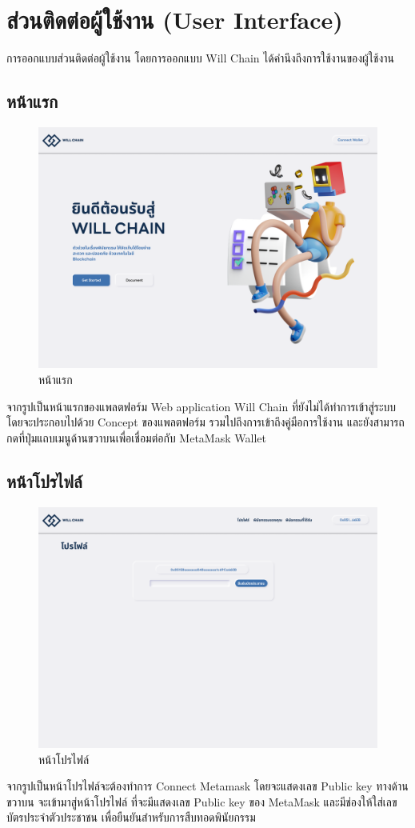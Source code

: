 \documentclass[12pt,oneside,openright,a4paper]{cpe-thai-project}
\begin{document}
\section{ส่วนติดต่อผู้ใช้งาน (User Interface)}
\tab การออกแบบส่วนติดต่อผู้ใช้งาน โดยการออกแบบ Will Chain ได้คำนึงถึงการใช้งานของผู้ใช้งาน 
\subsection{หน้าแรก}
		\begin{figure}[!thb]
			\centering
			\includegraphics[scale=0.2]{Home}
			\caption{หน้าแรก}
		\end{figure}
		\FloatBarrier
		\tab จากรูปเป็นหน้าแรกของแพลตฟอร์ม Web application Will Chain ที่ยังไม่ได้ทำการเข้าสู่ระบบ โดยจะประกอบไปด้วย Concept ของแพลตฟอร์ม รวมไปถึงการเข้าถึงคู่มือการใช้งาน และยังสามารถกดที่ปุ่มแถบเมนูด้านขวาบนเพื่อเชื่อมต่อกับ MetaMask Wallet
\subsection{หน้าโปรไฟล์}
		\begin{figure}[!thb]
			\centering
			\includegraphics[scale=0.2]{profile}
			\caption{หน้าโปรไฟล์}
		\end{figure}
		\FloatBarrier
		\tab จากรูปเป็นหน้าโปรไฟล์จะต้องทำการ Connect Metamask โดยจะแสดงเลข Public key ทางด้านขวาบน จะเข้ามาสู่หน้าโปรไฟล์ ที่จะมีแสดงเลข Public key ของ MetaMask และมีช่องให้ใส่เลขบัตรประจำตัวประชาชน เพื่อยืนยันสำหรับการสืบทอดพินัยกรรม
\end{document}
